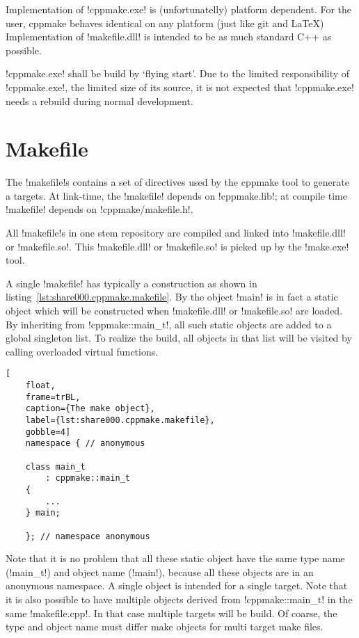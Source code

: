 Implementation of !cppmake.exe! is (unfortunatelly) platform dependent.
For the user, cppmake behaves identical on any platform (just like git and LaTeX)
Implementation of !makefile.dll! is intended to be as much standard C++ as possible.

!cppmake.exe! shall be build by `flying start'. Due to the limited responsibility
of !cppmake.exe!, the limited size of its source, it is not expected that !cppmake.exe!
needs a rebuild during normal development.

\section{Makefile}
\label{sec:share000.cppmake.makefile}

The !makefile!s contains a set of directives used by the cppmake tool to generate
a targets. At link-time, the !makefile! depends on !cppmake.lib!; at compile time
!makefile! depends on !cppmake/makefile.h!.

All !makefile!s in one stem repository are compiled and linked into !makefile.dll!
or !makefile.so!.
This !makefile.dll! or !makefile.so! is picked up by the !make.exe! tool.

A single !makefile! has typically a construction as shown in 
listing~\ref{lst:share000.cppmake.makefile}. By the object !main! is in fact a
static object which will be constructed when !makefile.dll! or !makefile.so! are
loaded. By inheriting from !cppmake::main_t!, all such static objects are added
to a global singleton list. To realize the build, all objects in that list will
be visited by calling overloaded virtual functions.

\begin{lstlisting}[
    float,
    frame=trBL,
    caption={The make object},
    label={lst:share000.cppmake.makefile},
    gobble=4]
	namespace { // anonymous

	class main_t
		: cppmake::main_t
	{
		...
	} main;

	}; // namespace anonymous
\end{lstlisting}

Note that it is no problem that all these static object have the same type name
(!main_t!) and object name (!main!), because all these objects are in an anonymous
namespace. A single object is intended for a single target. Note that it is also
possible to have multiple objects derived from !cppmake::main_t! in the same
!makefile.cpp!. In that case multiple targets will be build. Of coarse, the type
and object name must differ make objects for multi target make files.

